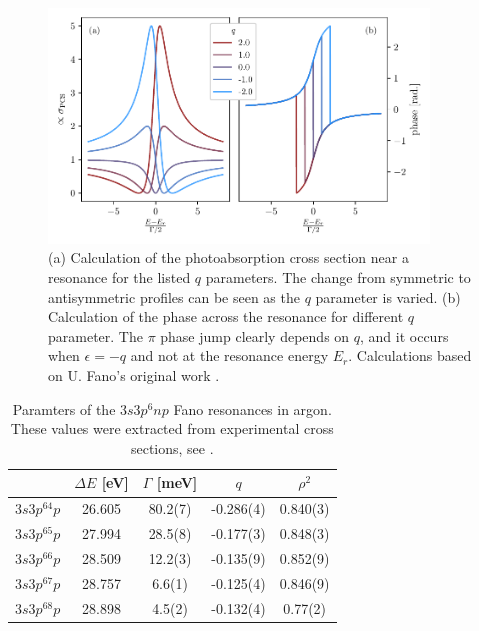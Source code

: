 \begin{figure}
	\centering
	\includegraphics[width=0.9\textwidth]{figures/ATS/cs_phase.pdf}
	\caption{(a) Calculation of the photoabsorption cross section near a resonance for the listed $q$ parameters.  The change from symmetric to antisymmetric profiles can be seen as the $q$ parameter is varied. (b) Calculation of the phase across the resonance for different $q$ parameter. The $\pi$ phase jump clearly depends on $q$, and it occurs when $\epsilon=-q$ and not at the resonance energy $E_r$. Calculations based on U. Fano's original work \cite{fanoEffectsConfigurationInteraction1961}.}
	\label{fig:cross_sec_and_phase}
\end{figure}

\begin{table}[]
	\centering
	\begin{tabular}{lcccc}
		\hline\hline
		\multicolumn{1}{c}{} & $\Delta E$ [eV]   & $\Gamma$ [meV]   & $q$         & $\rho^2$     \\ \hline
		$3s3p^64p$              & 26.605 & 80.2(7) & -0.286(4) & 0.840(3) \\
		$3s3p^65p$              & 27.994 & 28.5(8) & -0.177(3) & 0.848(3) \\
		$3s3p^66p$              & 28.509 & 12.2(3) & -0.135(9) & 0.852(9) \\
		$3s3p^67p$              & 28.757 & 6.6(1)  & -0.125(4) & 0.846(9) \\
		$3s3p^68p$              & 28.898 & 4.5(2)  & -0.132(4) & 0.77(2)  \\ \hline\hline
	\end{tabular}
	\caption{Paramters of the $3s3p^6np$ Fano resonances in argon. These values were extracted from experimental cross sections, see \cite{caretteMulticonfigurationalHartreeFockClosecoupling2013}.}
	\label{table:fano_params}
\end{table}


